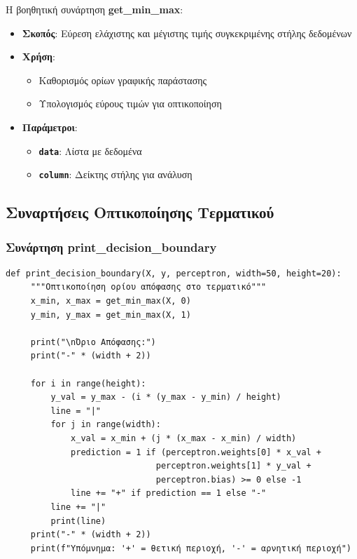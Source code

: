 \documentclass[12pt,a4paper,twoside]{book}
\begin{document}
Η βοηθητική συνάρτηση \textbf{get\_min\_max}:
\begin{itemize}
    \item \textbf{Σκοπός}: Εύρεση ελάχιστης και μέγιστης τιμής συγκεκριμένης στήλης δεδομένων
    \item \textbf{Χρήση}:
    \begin{itemize}
        \item Καθορισμός ορίων γραφικής παράστασης
        \item Υπολογισμός εύρους τιμών για οπτικοποίηση
    \end{itemize}
    \item \textbf{Παράμετροι}:
    \begin{itemize}
        \item \textbf{\texttt{data}}: Λίστα με δεδομένα
        \item \textbf{\texttt{column}}: Δείκτης στήλης για ανάλυση
    \end{itemize}
\end{itemize}

\subsection{Συναρτήσεις Οπτικοποίησης Τερματικού}

\subsubsection{Συνάρτηση print\_decision\_boundary}

\begin{tcolorbox}[myCustomStyle = {perceptron.py}]
    \begin{lstlisting}[style=myPythonStyle]
 def print_decision_boundary(X, y, perceptron, width=50, height=20):
     """Οπτικοποίηση ορίου απόφασης στο τερματικό"""
     x_min, x_max = get_min_max(X, 0)
     y_min, y_max = get_min_max(X, 1)

     print("\nΌριο Απόφασης:")
     print("-" * (width + 2))

     for i in range(height):
         y_val = y_max - (i * (y_max - y_min) / height)
         line = "|"
         for j in range(width):
             x_val = x_min + (j * (x_max - x_min) / width)
             prediction = 1 if (perceptron.weights[0] * x_val + 
                              perceptron.weights[1] * y_val + 
                              perceptron.bias) >= 0 else -1
             line += "+" if prediction == 1 else "-"
         line += "|"
         print(line)
     print("-" * (width + 2))
     print(f"Υπόμνημα: '+' = θετική περιοχή, '-' = αρνητική περιοχή")
    \end{lstlisting}
\end{tcolorbox}
\end{document}
